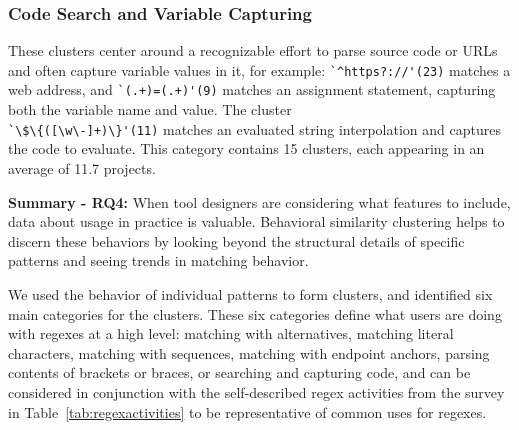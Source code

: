 
\subsubsection{Code Search and Variable Capturing}
\label{cluster:search}
These clusters center around a recognizable effort to parse source code or URLs and often capture variable values in it, for example:
\verb!`^https?://'(23)! matches a web address, and \verb!`(.+)=(.+)'(9)! matches an assignment statement, capturing both the variable name and value.  
The cluster \\ \verb!`\$\{([\w\-]+)\}'(11)! matches an evaluated string interpolation and captures the code to evaluate.
This category contains 15 clusters, each appearing in an average of 11.7 projects.  

\vspace{6pt}
\textbf{Summary - RQ4:}
When tool designers are considering what features to include, data about usage in practice is valuable.  Behavioral similarity clustering  helps to discern these behaviors by looking beyond the structural details of specific patterns and seeing trends in  matching behavior. %

We used the behavior of individual patterns to form clusters, and identified six main categories for the clusters. 
These six categories define what users are doing with regexes at a high level: matching with alternatives, matching literal characters, matching with sequences, matching with endpoint anchors, parsing contents of brackets or braces, or searching and capturing code, and can be considered in conjunction with the self-described regex activities from the survey in Table~\ref{tab:regexactivities} to be representative of common uses for regexes.



